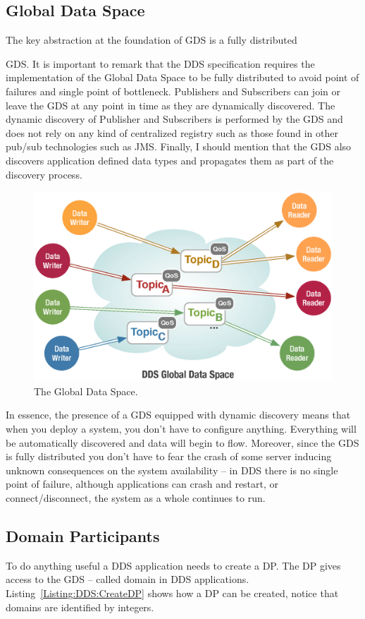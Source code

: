 \subsection{Global Data Space}
The key abstraction at the foundation of \ac{GDS} is a fully 
distributed {\ac{GDS}. It is important to remark that the \ac{DDS} 
specification requires the implementation of the Global Data Space 
to be fully distributed to avoid point of failures and single point 
of bottleneck. Publishers and Subscribers can join or leave the \ac{GDS} 
at any point in time as they are dynamically discovered. The dynamic 
discovery of Publisher and Subscribers is performed by the \ac{GDS} 
and does not rely on any kind of centralized registry such as those 
found in other pub/sub technologies such as \ac{JMS}. Finally, 
I should mention that the \ac{GDS} also discovers application defined 
data types and propagates them as part of the discovery process.
\begin{figure}[ht]
	\centering
	\includegraphics[scale=0.5]{figs/gds.eps}
	\caption{The Global Data Space.}
	\label{Figure:DDS:Standard}
\end{figure}
In essence, the presence of a \ac{GDS} equipped with dynamic discovery 
means that when you deploy a system, you don't have to configure anything. 
Everything will be automatically discovered and data will begin to flow. 
Moreover, since the \ac{GDS} is fully distributed you don't have to fear the 
crash of some server inducing unknown consequences on the system 
availability -- in DDS there is no single point of failure, although 
applications can crash and restart, or connect/disconnect, the system 
as a whole continues to run.

\subsection{Domain Participants}
To do anything useful a \ac{DDS} application needs to create a \ac{DP}.
The \ac{DP} gives access to the \ac{GDS} -- called domain in \ac{DDS} applications. 
Listing~\ref{Listing:DDS:CreateDP} shows how a \ac{DP} can be created,
notice that domains are identified by integers.

}
